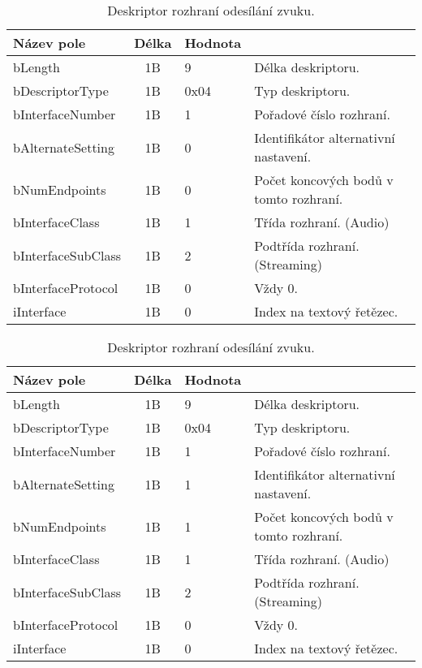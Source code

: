 
\begin{table}[ht!]
\begin{center}
\begin{tabular}{|l|c|l|l|}
\hline 
Název pole & Délka & Hodnota &  \\ 
\hline
bLength & 1B & 9 & Délka deskriptoru.\\
\hline
bDescriptorType & 1B & 0x04 & Typ deskriptoru. \\
\hline
bInterfaceNumber & 1B & 1 & Pořadové číslo rozhraní.\\
\hline
bAlternateSetting & 1B & 0 & Identifikátor alternativní nastavení.\\
\hline
bNumEndpoints & 1B & 0 & Počet koncových bodů v tomto rozhraní.\\
\hline
bInterfaceClass & 1B & 1 & Třída rozhraní. (Audio)\\
\hline
bInterfaceSubClass & 1B & 2 & Podtřída rozhraní. (Streaming)\\
\hline
bInterfaceProtocol & 1B & 0 & Vždy 0. \\
\hline
iInterface & 1B & 0 & Index na textový řetězec.\\
\hline
\end{tabular} 
\end{center}
\caption{Deskriptor rozhraní odesílání zvuku.}
\label{tab:usb-aud-snd-0} 
\end{table}


\begin{table}[ht!]
\begin{center}
\begin{tabular}{|l|c|l|l|}
\hline 
Název pole & Délka & Hodnota &  \\ 
\hline
bLength & 1B & 9 & Délka deskriptoru.\\
\hline
bDescriptorType & 1B & 0x04 & Typ deskriptoru. \\
\hline
bInterfaceNumber & 1B & 1 & Pořadové číslo rozhraní.\\
\hline
bAlternateSetting & 1B & 1 & Identifikátor alternativní nastavení.\\
\hline
bNumEndpoints & 1B & 1 & Počet koncových bodů v tomto rozhraní.\\
\hline
bInterfaceClass & 1B & 1 & Třída rozhraní. (Audio)\\
\hline
bInterfaceSubClass & 1B & 2 & Podtřída rozhraní. (Streaming)\\
\hline
bInterfaceProtocol & 1B & 0 & Vždy 0. \\
\hline
iInterface & 1B & 0 & Index na textový řetězec.\\
\hline
\end{tabular} 
\end{center}
\caption{Deskriptor rozhraní odesílání zvuku.}
\label{tab:usb-aud-snd} 
\end{table}

